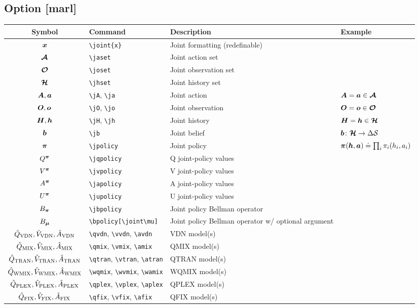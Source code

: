 \documentclass{article}
\begin{document}
\subsection*{Option [marl]}

\begin{tabular}{clll}
  \toprule
  Symbol & Command & Description & Example \\
  \midrule
  $\joint{x}$ & \verb|\joint{x}| & Joint formatting (redefinable) \\
  \midrule
  $\jaset$ & \verb|\jaset| & Joint action set \\
  $\joset$ & \verb|\joset| & Joint observation set \\
  $\jhset$ & \verb|\jhset| & Joint history set \\
  \midrule
  $\jA, \ja$ & \verb|\jA|, \verb|\ja| & Joint action & $\jA = \ja\in\jaset$ \\
  $\jO, \jo$ & \verb|\jO|, \verb|\jo| & Joint observation & $\jO = \jo\in\joset$ \\
  $\jH, \jh$ & \verb|\jH|, \verb|\jh| & Joint history & $\jH = \jh\in\jhset$ \\
  $\jb$ & \verb|\jb| & Joint belief & $\jb \colon\jhset \to\Delta\sset$ \\
  \midrule
  $\jpolicy$ & \verb|\jpolicy| & Joint policy & $\jpolicy(\jh, \ja) \doteq \prod_i \policy_i(h_i, a_i)$ \\
  \midrule
  $\jqpolicy$ & \verb|\jqpolicy| & Q joint-policy values \\
  $\jvpolicy$ & \verb|\jvpolicy| & V joint-policy values \\
  $\japolicy$ & \verb|\japolicy| & A joint-policy values \\
  $\jupolicy$ & \verb|\jupolicy| & U joint-policy values \\
  \midrule
  $\jbpolicy$ & \verb|\jbpolicy| & Joint policy Bellman operator \\
  $\jbpolicy[\joint\mu]$ & \verb|\bpolicy[\joint\mu]| & Joint policy Bellman operator w/ optional argument \\
  \midrule
  $\qvdn, \vvdn, \avdn$ & \verb|\qvdn|, \verb|\vvdn|, \verb|\avdn| & VDN model(s) \\
  $\qmix, \vmix, \amix$ & \verb|\qmix|, \verb|\vmix|, \verb|\amix| & QMIX model(s) \\
  $\qtran, \vtran, \atran$ & \verb|\qtran|, \verb|\vtran|, \verb|\atran| & QTRAN model(s) \\
  $\wqmix, \wvmix, \wamix$ & \verb|\wqmix|, \verb|\wvmix|, \verb|\wamix| & WQMIX model(s) \\
  $\qplex, \vplex, \aplex$ & \verb|\qplex|, \verb|\vplex|, \verb|\aplex| & QPLEX model(s) \\
  $\qfix, \vfix, \afix$ & \verb|\qfix|, \verb|\vfix|, \verb|\afix| & QFIX model(s) \\
  \bottomrule
\end{tabular}
\end{document}
